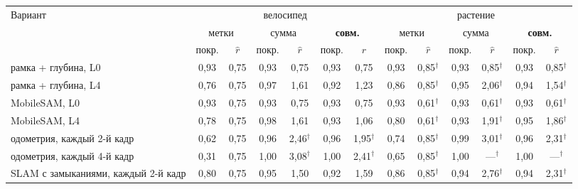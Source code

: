 \begin{tabular}{l|cccccc|cccccc}
\toprule
Вариант & \multicolumn{6}{c|}{велосипед} & \multicolumn{6}{c}{растение} \\
 & \multicolumn{2}{c}{метки} & \multicolumn{2}{c}{сумма} & \multicolumn{2}{c}{\textbf{совм.}} & \multicolumn{2}{c}{метки} & \multicolumn{2}{c}{сумма} & \multicolumn{2}{c}{\textbf{совм.}} \\
 & покр. & $\hat r$ & покр. & $\hat r$ & покр. & $\hat r$ & покр. & $\hat r$ & покр. & $\hat r$ & покр. & $\hat r$ \\
\midrule
рамка + глубина, L0 & 0{,}93 & 0{,}75 & 0{,}93 & 0{,}75 & 0{,}93 & 0{,}75 & 0{,}93 & 0{,}85$^\dagger$ & 0{,}93 & 0{,}85$^\dagger$ & 0{,}93 & 0{,}85$^\dagger$ \\
рамка + глубина, L4 & 0{,}76 & 0{,}75 & 0{,}97 & 1{,}61 & 0{,}92 & 1{,}23 & 0{,}86 & 0{,}85$^\dagger$ & 0{,}95 & 2{,}06$^\dagger$ & 0{,}94 & 1{,}54$^\dagger$ \\
MobileSAM, L0 & 0{,}93 & 0{,}75 & 0{,}93 & 0{,}75 & 0{,}93 & 0{,}75 & 0{,}93 & 0{,}61$^\dagger$ & 0{,}93 & 0{,}61$^\dagger$ & 0{,}93 & 0{,}61$^\dagger$ \\
MobileSAM, L4 & 0{,}78 & 0{,}75 & 0{,}98 & 1{,}61 & 0{,}93 & 1{,}06 & 0{,}80 & 0{,}61$^\dagger$ & 0{,}93 & 1{,}91$^\dagger$ & 0{,}95 & 1{,}86$^\dagger$ \\
одометрия, каждый 2-й кадр & 0{,}62 & 0{,}75 & 0{,}96 & 2{,}46$^\dagger$ & 0{,}96 & 1{,}95$^\dagger$ & 0{,}74 & 0{,}85$^\dagger$ & 0{,}99 & 3{,}01$^\dagger$ & 0{,}96 & 2{,}31$^\dagger$ \\
одометрия, каждый 4-й кадр & 0{,}31 & 0{,}75 & 1{,}00 & 3{,}08$^\dagger$ & 1{,}00 & 2{,}41$^\dagger$ & 0{,}65 & 0{,}85$^\dagger$ & 1{,}00 & ---$^\dagger$ & 1{,}00 & ---$^\dagger$ \\
SLAM с замыканиями, каждый 2-й кадр & 0{,}80 & 0{,}75 & 0{,}95 & 1{,}50 & 0{,}92 & 1{,}59 & 0{,}86 & 0{,}85$^\dagger$ & 0{,}94 & 2{,}76$^\dagger$ & 0{,}94 & 2{,}31$^\dagger$ \\
\bottomrule
\end{tabular}
